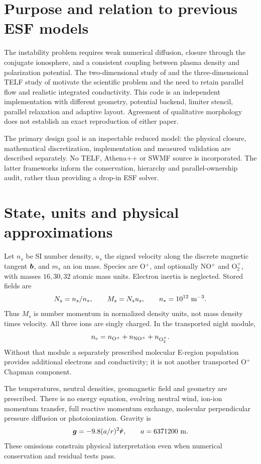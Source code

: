 \section{Purpose and relation to previous ESF models}
The instability problem requires weak numerical diffusion, closure through
the conjugate ionosphere, and a consistent coupling between plasma density
and polarization potential. The two-dimensional study of
\citet{Li2021} and the three-dimensional TELF study of \citet{Li2023} motivate
the scientific problem and the need to retain parallel flow and realistic
integrated conductivity. This code is an independent implementation with
different geometry, potential backend, limiter stencil, parallel relaxation
and adaptive layout. Agreement of qualitative morphology does not establish
an exact reproduction of either paper.

The primary design goal is an inspectable reduced model: the physical
closure, mathematical discretization, implementation and measured validation
are described separately. No TELF, Athena++ or SWMF source is incorporated.
The latter frameworks inform the conservation, hierarchy and parallel-ownership
audit, rather than providing a drop-in ESF solver.

\section{State, units and physical approximations}
Let $n_s$ be SI number density, $u_s$ the signed velocity along the discrete
magnetic tangent $\bm b$, and $m_s$ an ion mass. Species are O$^+$, and optionally
NO$^+$ and O$_2^+$, with masses $16,30,32$ atomic mass units. Electron inertia
is neglected. Stored fields are
\begin{equation}
 N_s=n_s/n_*,\qquad M_s=N_su_s,\qquad n_*=10^{12}\ {\rm m}^{-3}.
\end{equation}
Thus $M_s$ is number momentum in normalized density units, not mass density
times velocity. All three ions are singly charged. In the transported night
module,
\begin{equation} n_e=n_{\rm O^+}+n_{\rm NO^+}+n_{\rm O_2^+}.\label{eq:ne}\end{equation}
Without that module a separately prescribed molecular E-region population
provides additional electrons and conductivity; it is not another transported
O$^+$ Chapman component.

The temperatures, neutral densities, geomagnetic field and geometry are
prescribed. There is no energy equation, evolving neutral wind, ion-ion
momentum transfer, full reactive momentum exchange, molecular perpendicular
pressure diffusion or photoionization. Gravity is
\begin{equation}
 \bm g=-9.8(a/r)^2\hat{\bm r},\qquad a=6371200\ {\rm m}.
\end{equation}
These omissions constrain physical interpretation even when numerical
conservation and residual tests pass.

